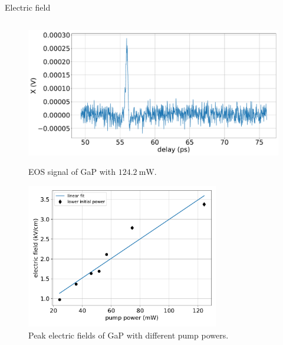 \documentclass[aspectratio=1610, 9pt]{beamer}
\begin{document}
\begin{frame}{Electric field}
\begin{columns}
\begin{column}{.5\textwidth}
    \begin{center}
    \begin{figure}
      \centering
      \begin{overprint}
        \includegraphics[width=\textwidth]{images/GaP14_55_42normalX.pdf}\caption{\textcolor{tugreen}{EOS signal} of GaP with $\SI{124.2}{\milli\W }$.}
        \includegraphics[width=0.75\textwidth]{images/eltric_field_GaP.pdf}\caption{\textcolor{tugreen}{Peak electric fields} of GaP with different pump powers.}
      \end{overprint}
    \end{figure}
  \end{center}
  \end{column}
  \end{columns}
\end{frame}
\end{document}
